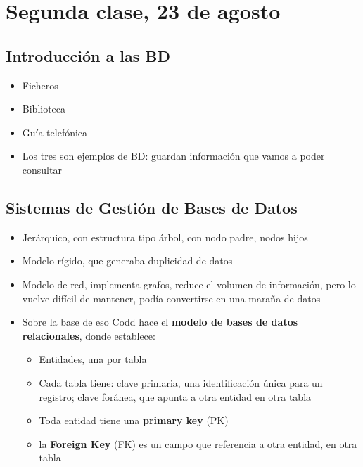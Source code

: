 \section{Segunda clase, 23 de agosto}

\subsection{Introducción a las BD}
\begin{itemize}
    \item Ficheros
    \item Biblioteca
    \item Guía telefónica
    \item Los tres son ejemplos de BD: 
    guardan información que vamos a poder consultar
\end{itemize}

\subsection{Sistemas de Gestión de Bases de Datos}
\begin{itemize}
    \item Jerárquico, con estructura tipo árbol,
    con nodo padre, nodos hijos
    \item Modelo rígido, que generaba duplicidad de datos 
    \item Modelo de red, implementa grafos, reduce el volumen de información,
    pero lo vuelve difícil de mantener, podía convertirse en una maraña de datos
    \item Sobre la base de eso Codd hace el \textbf{modelo de bases de datos 
    relacionales}, donde establece:
    \begin{itemize}
        \item Entidades, una por tabla 
        \item Cada tabla tiene: clave primaria, una identificación única para un 
        registro; clave foránea, que apunta a otra entidad en otra tabla
        \item Toda entidad tiene una \textbf{primary key} (PK)
        \item la \textbf{Foreign Key} (FK) es un campo que referencia a otra 
        entidad, en otra tabla
    \end{itemize}
\end{itemize}

